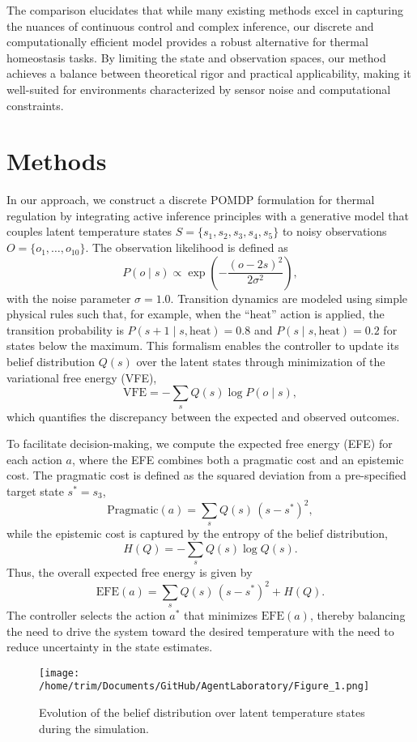 \documentclass[11pt]{article}
\begin{document}
The comparison elucidates that while many existing methods excel in capturing the nuances of continuous control and complex inference, our discrete and computationally efficient model provides a robust alternative for thermal homeostasis tasks. By limiting the state and observation spaces, our method achieves a balance between theoretical rigor and practical applicability, making it well-suited for environments characterized by sensor noise and computational constraints.

\section{Methods}
In our approach, we construct a discrete POMDP formulation for thermal regulation by integrating active inference principles with a generative model that couples latent temperature states \(S=\{s_1, s_2, s_3, s_4, s_5\}\) to noisy observations \(O=\{o_1,\ldots,o_{10}\}\). The observation likelihood is defined as 
\[
P(o\mid s) \propto \exp\left(-\frac{(o-2s)^2}{2\sigma^2}\right),
\]
with the noise parameter \(\sigma=1.0\). Transition dynamics are modeled using simple physical rules such that, for example, when the “heat” action is applied, the transition probability is \(P(s+1\mid s,\text{heat})=0.8\) and \(P(s\mid s,\text{heat})=0.2\) for states below the maximum. This formalism enables the controller to update its belief distribution \(Q(s)\) over the latent states through minimization of the variational free energy (VFE),
\[
\mathrm{VFE} = -\sum_{s} Q(s)\log P(o\mid s),
\]
which quantifies the discrepancy between the expected and observed outcomes.

To facilitate decision-making, we compute the expected free energy (EFE) for each action \(a\), where the EFE combines both a pragmatic cost and an epistemic cost. The pragmatic cost is defined as the squared deviation from a pre-specified target state \(s^*=s_3\),
\[
\text{Pragmatic}(a)=\sum_{s} Q(s)\,(s-s^*)^2,
\]
while the epistemic cost is captured by the entropy of the belief distribution,
\[
H(Q) = -\sum_{s} Q(s)\log Q(s).
\]
Thus, the overall expected free energy is given by
\[
\mathrm{EFE}(a) = \sum_{s} Q(s)\,(s-s^*)^2 + H(Q).
\]
The controller selects the action \(a^*\) that minimizes \(\mathrm{EFE}(a)\), thereby balancing the need to drive the system toward the desired temperature with the need to reduce uncertainty in the state estimates.

\begin{figure}[h]
\caption{Evolution of the belief distribution over latent temperature states during the simulation.}
\centering
\texttt{[image: /home/trim/Documents/GitHub/AgentLaboratory/Figure\_1.png]}
\label{fig:fig1}
\end{figure}
\end{document}
